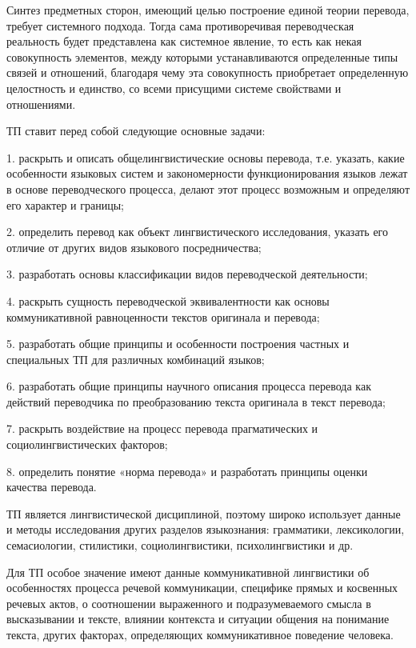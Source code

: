 Синтез предметных сторон, имеющий целью построение единой теории перевода, требует системного подхода. Тогда сама противоречивая переводческая реальность будет представлена как системное явление, то есть как некая совокупность элементов, между которыми устанавливаются определенные типы связей и отношений, благодаря чему эта совокупность приобретает определенную целостность и единство, со всеми присущими системе свойствами и отношениями.

ТП ставит перед собой следующие основные задачи:

1. раскрыть и описать общелингвистические основы перевода, т.е. указать, какие особенности языковых систем и закономерности функционирования языков лежат в основе переводческого процесса, делают этот процесс возможным и опре­деляют его характер и границы;

2. определить перевод как объект лингвистического исследования, указать его отличие от других видов языкового по­средничества;

3. разработать основы классификации видов переводческой деятельности;

4. раскрыть сущность переводческой эквивалентности как основы коммуникативной равноценности текстов оригинала и перевода;

5. разработать общие принципы и особенности построения частных и специальных ТП для различных комбинаций языков;

6. разработать общие принципы научного описания процесса перевода как действий переводчика по преобразованию текста оригинала в текст перевода;

7. раскрыть воздействие на процесс перевода прагматических и социолингвистических факторов;

8. определить понятие «норма перевода» и разработать принципы оценки качества перевода.

ТП является лингвистической дисциплиной, поэтому широко использует данные и методы исследования других разделов языкознания: грамматики, лексикологии, семасиологии, стилистики, социолингвистики, психолингвистики и др.

Для ТП особое значение имеют данные коммуникативной лингвистики об особенностях процесса речевой коммуникации, специфике прямых и косвенных речевых актов, о соотношении выраженного и подразумеваемого смысла в высказывании и тексте, влиянии контекста и ситуации общения на понимание текста, других факторах, определяющих коммуникативное поведение человека.

